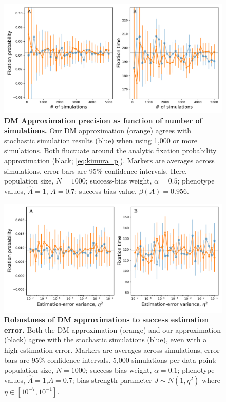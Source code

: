 \documentclass[12pt]{extarticle}
\begin{document}
\begin{figure}[h]
    \includegraphics[width=\linewidth]{../figures/final/num_sims.pdf}
  \caption{
  \textbf{DM Approximation precision as function of number of simulations.}
  Our DM approximation (orange) agrees with stochastic simulation results (blue) when using 1,000 or more simulations.
  Both fluctuate around the analytic fixation probability approximation (black; \cref{eq:kimura_p}).
  Markers are averages across simulations, error bars are 95\% confidence intervals.
  Here, population size, $N=1000$; success-bias weight, $\alpha=0.5$; phenotype values, $\hat{A}=1$, $A=0.7$; success-bias value, $\beta(A)=0.956$.}	
  \label{fig:num_sims}
\end{figure}


\begin{figure}
    \includegraphics[width=\linewidth]{../figures/final/full_vs_dm_mutation.pdf}
  \caption{
  \textbf{Robustness of DM approximations to success estimation error.}
  Both the DM approximation (orange) and our approximation (black) agree with the stochastic simulations (blue), even with a high estimation error.
  Markers are averages across simulations, error bars are 95\% confidence intervals.
  5,000 simulations per data point; population size, $N=1000$; success-bias weight, $\alpha=0.1$; phenotype values, $\hat{A}=1$,$A=0.7$; bias strength parameter $J\sim N(1,\eta^2)$ where $\eta \in [10^{-7},10^{-1}]$.
  }	
  \label{fig:hetro_error}
\end{figure}
\end{document}
